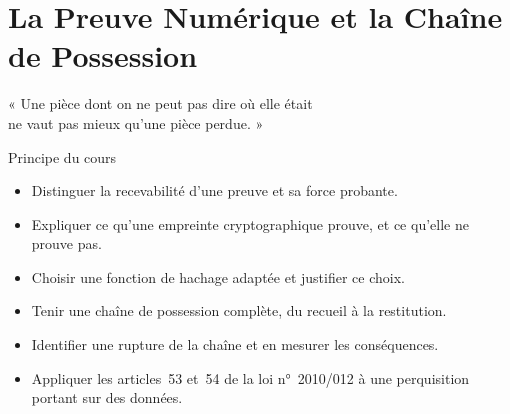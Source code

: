 
\chapter{La Preuve Numérique et la Chaîne de Possession}
\label{chap:preuve}

\epigraph{%
    « Une pièce dont on ne peut pas dire où elle était\\
    ne vaut pas mieux qu'une pièce perdue. »%
}{Principe du cours}


\begin{boxobjectifs}
\begin{itemize}
    \item Distinguer la recevabilité d'une preuve et sa force probante.
    \item Expliquer ce qu'une empreinte cryptographique prouve, et ce
          qu'elle ne prouve pas.
    \item Choisir une fonction de hachage adaptée et justifier ce choix.
    \item Tenir une chaîne de possession complète, du recueil à la
          restitution.
    \item Identifier une rupture de la chaîne et en mesurer les
          conséquences.
    \item Appliquer les articles~53 et~54 de la loi n°~2010/012 à une
          perquisition portant sur des données.
\end{itemize}
\end{boxobjectifs}

\bigskip


